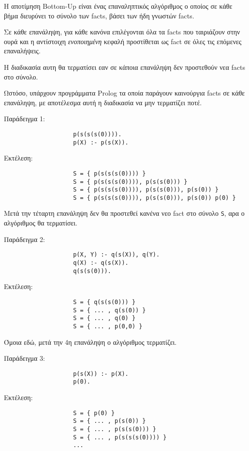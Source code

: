\documentclass[10pt]{article}
\begin{document}
H αποτίμηση Bottom-Up είναι ένας επαναληπτικός αλγόριθμος ο οποίος σε κάθε βήμα διευρύνει το σύνολο των facts, βάσει των ήδη γνωστών facts.\

Σε κάθε επανάληψη, για κάθε κανόνα επιλέγονται όλα τα facts που ταιριάζουν στην ουρά και η αντίστοιχη \textit{ενοποιημένη} κεφαλή προστίθεται ως fact σε όλες τις επόμενες επαναλήψεις.\

Η διαδικασία αυτη θα τερματίσει εαν σε κάποια επανάληψη δεν προστεθούν νεα facts στο σύνολο.\

Ωστόσο, υπάρχουν προγράμματα Prolog τα οποία παράγουν καινούργια facts σε κάθε επανάληψη, με αποτέλεσμα αυτή η διαδικασία να μην τερματίζει ποτέ.\


Παράδειγμα 1:
\begin{verbatim}
                    p(s(s(s(0)))).
                    p(Χ) :- p(s(Χ)).
\end{verbatim}

Εκτέλεση:
\begin{verbatim}
                    S = { p(s(s(s(0)))) }
                    S = { p(s(s(s(0)))), p(s(s(0))) }
                    S = { p(s(s(s(0)))), p(s(s(0))), p(s(0)) }
                    S = { p(s(s(s(0)))), p(s(s(0))), p(s(0)) p(0) }
\end{verbatim}

Μετά την τέταρτη επανάληψη δεν θα προστεθεί κανένα νεο fact στο σύνολο \verb|S|, αρα ο αλγόριθμος θα τερματίσει.





Παράδειγμα 2:
\begin{verbatim}
                    p(X, Y) :- q(s(X)), q(Y).
                    q(X) :- q(s(X)).
                    q(s(s(0))).
\end{verbatim}

Εκτέλεση:
\begin{verbatim}
                    S = { q(s(s(0))) }
                    S = { ... , q(s(0)) }
                    S = { ... , q(0) }
                    S = { ... , p(0,0) }
\end{verbatim}

Όμοια εδώ, μετά την 4η επανάληψη ο αλγόριθμος τερματίζει.




Παράδειγμα 3:
\begin{verbatim}
                    p(s(X)) :- p(X).
                    p(0).
\end{verbatim}

Εκτέλεση:
\begin{verbatim}
                    S = { p(0) }
                    S = { ... , p(s(0)) }
                    S = { ... , p(s(s(0))) }
                    S = { ... , p(s(s(s(0)))) }
                    ...
\end{verbatim}
\end{document}
